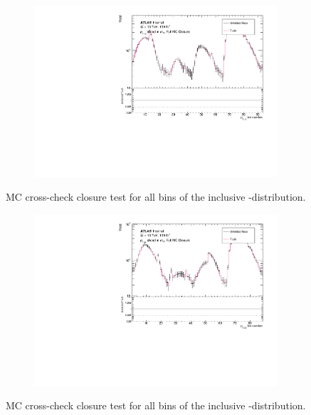 \begin{figure}[htb]
  \centering
  \begin{subfigure}{.65\textwidth}\centering\includegraphics[width = 0.99\textwidth]{Figures/m4l/UnfoldingStudies/v014_closure/FullMCClosure_pt12_m4l.pdf}\end{subfigure}
\caption{MC cross-check closure test for all bins of the inclusive \ptZOne-\mFourL distribution.}
 \end{figure}

\begin{figure}[htb]
  \centering
  \begin{subfigure}{.65\textwidth}\centering\includegraphics[width = 0.99\textwidth]{Figures/m4l/UnfoldingStudies/v014_closure/FullMCClosure_pt34_m4l.pdf}\end{subfigure}
\caption{MC cross-check closure test for all bins of the inclusive \ptZTwo-\mFourL distribution.}
 \end{figure}

